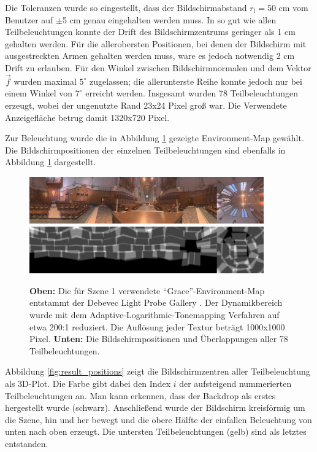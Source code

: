    Die Toleranzen wurde so eingestellt, dass der Bildschirmabstand $r_l=$50 cm vom Benutzer  auf $\pm$5 cm genau eingehalten werden muss. 
   In so gut wie allen Teilbeleuchtungen konnte der Drift des Bildschirmzentrums geringer als 1 cm gehalten werden.
   Für die allerobersten Positionen, bei denen der Bildschirm mit ausgestreckten Armen gehalten werden muss, ware es jedoch notwendig 2 cm Drift zu erlauben.
   Für den Winkel zwischen Bildschirmnormalen und dem Vektor $\vec{f}$ wurden maximal  $5^\circ$ zugelassen; die allerunterste Reihe konnte jedoch nur bei einem Winkel von $7^\circ$ erreicht werden.
   Insgesamt wurden 78 Teilbeleuchtungen erzeugt, wobei der ungenutzte Rand 23x24 Pixel groß war. Die Verwendete Anzeigefläche betrug damit 1320x720 Pixel.
   
   Zur Beleuchtung wurde die in Abbildung \ref{fig:result_cubemap} gezeigte Environment-Map gewählt.
   Die Bildschirmpositionen der einzelnen Teilbeleuchtungen sind ebenfalls in Abbildung \ref{fig:result_cubemap} dargestellt. 

   \begin{figure}[H]
    \centering
     \includegraphics[width=0.9\textwidth]{../graphics/ergebnisse/cubemap_grace_ldr_small.jpg}
     \includegraphics[width=0.9\textwidth]{../graphics/ergebnisse/cubemap_used_all_small.png}
    \caption[Ergebnis: Szene 1 (Cube-Map)]{\textbf{Oben:} Die für Szene 1 verwendete ``Grace''-Environment-Map entstammt der Debevec Light Probe Gallery \cite{lightprobe_gallery}. 
   Der Dynamikbereich wurde mit dem Adaptive-Logarithmic-Tonemapping Verfahren \cite{Drago_2003}  auf etwa 200:1 reduziert. Die Auflösung jeder Textur beträgt 1000x1000 Pixel.
 \textbf{Unten:} Die Bildschirmpositionen und Überlappungen aller 78 Teilbeleuchtungen.
}
    \label{fig:result_cubemap}
   \end{figure}

  Abbildung \ref{fig:result_positions} zeigt die Bildschirmzentren aller Teilbeleuchtung als 3D-Plot. Die Farbe gibt dabei den Index $i$ der aufsteigend nummerierten Teilbeleuchtungen an. 
   Man kann erkennen, dass der Backdrop als erstes hergestellt wurde (schwarz).
   Anschließend wurde der Bildschirm kreisförmig um die Szene, hin und her bewegt und die obere Hälfte der einfallen Beleuchtung von unten nach oben erzeugt.
   Die untersten Teilbeleuchtungen (gelb) sind als letztes entstanden.
   
